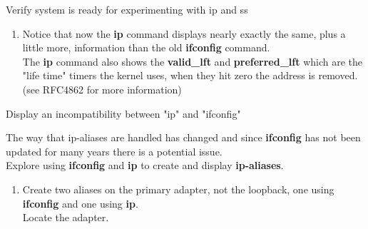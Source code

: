 \begin{Lab}
\begin{exe} {Verify system is ready for experimenting with ip and ss}
\begin{sol}
\begin{enumerate}
	\item 
	Notice that now the \textbf{ip} command displays 
	nearly exactly the same, plus a little more, 
	information than the old \textbf{ifconfig} command. \\
	The \textbf{ip} command also shows the \textbf{valid\_lft} and
	\textbf{preferred\_lft} which are the "life time" timers the 
	kernel uses, when they hit zero the address is removed. 
	(see RFC4862 for more information) 


      \end{enumerate}

   \end{sol}

\end{exe}

\begin{exe} {Display an incompatibility between "ip" and "ifconfig"}

	The way that ip-aliases are handled has changed and since 
	\textbf{ifconfig} has not been updated for many years 
	there is a potential issue.  \\
	Explore using \textbf{ifconfig} and \textbf{ip}
	to create and display \textbf{ip-aliases}. 

		
	\begin{sol}
	
		\begin{enumerate}
		\item 
		Create two aliases on the primary adapter, not the loopback,
			one using \textbf{ifconfig} and one 
			using \textbf{ip}.  \\
			Locate the adapter.


\end{enumerate}
\end{sol}
\end{exe}
\end{Lab}
